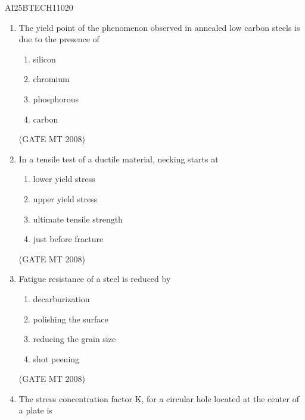 \documentclass[journal, 11pt, onecolumn]{IEEEtran}
\theoremstyle{remark}
\begin{document}
\begin{center}
    \Large{AI25BTECH11020}
\end{center} 



\begin{enumerate}
\item The yield point of the phenomenon observed in annealed low carbon steels is due to the presence of

\begin{multicols}{4}
\begin{enumerate}
\item silicon
\item chromium
\item phosphorous 
\item carbon
\end{enumerate}
\end{multicols}

\hfill(GATE MT 2008)

\item In a tensile test of a ductile material, necking starts at

\begin{multicols}{2}
\begin{enumerate}
\item lower yield stress
\item upper yield stress
\item ultimate tensile strength
\item just before fracture
\end{enumerate}
\end{multicols}


\hfill(GATE MT 2008)

\item Fatigue resistance of a steel is reduced by

\begin{multicols}{2}
\begin{enumerate}
\item decarburization
\item polishing the surface
\item reducing the grain size
\item shot peening
\end{enumerate}
\end{multicols}


\hfill(GATE MT 2008)

\item The stress concentration factor K, for a circular hole located at the center of a plate is


\end{enumerate}
\end{document}
